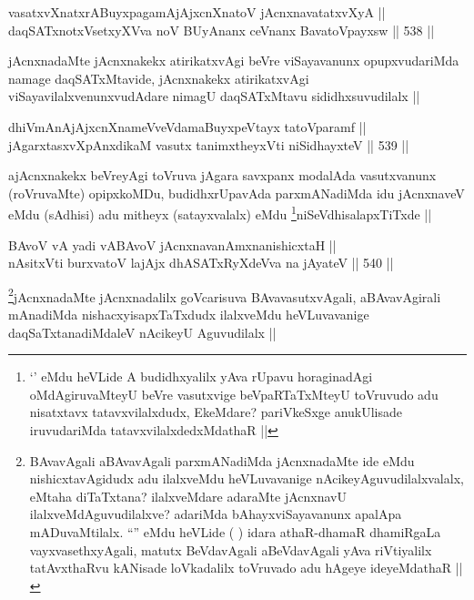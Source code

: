 
\begin{shl}
vasatxvXnatxrABuyxpagamAjAjxcnXnatoV jAcnxnavatatxvXyA || \\
daqSATxnotxV\s setxyXVva noV BUyAnanx ceVnanx BavatoV\s payxsw ||  538 ||  
\end{shl}

\begin{artha}
jAcnxnadaMte jAcnxnakekx atirikatxvAgi beVre viSayavanunx opupxvudariMda namage daqSATxMtavide, jAcnxnakekx atirikatxvAgi viSayavilalxvenunxvudAdare nimagU daqSATxMtavu sididhxsuvudilalx ||
\end{artha}


\begin{shl}
dhiVmAnAjAjxcnXnameVveVdamaBuyxpeVtayx tatoV\s paramf || \\
jAgarxtasxvXpAnxdikaM vasutx tanimxtheyxVti niSidhayxteV ||  539 ||  
\end{shl}

\begin{artha}
ajAcnxnakekx beVreyAgi toVruva jAgara savxpanx modalAda vasutxvanunx (roVruvaMte) opipxkoMDu, budidhxrUpavAda parxmANadiMda idu jAcnxnaveV eMdu (sAdhisi) adu mitheyx (satayxvalalx) eMdu \footnote{`\stext' eMdu heVLide A budidhxyalilx yAva rUpavu horaginadAgi oMdAgiruvaMteyU beVre vasutxvige beVpaRTaTxMteyU toVruvudo adu nisatxtavx tatavxvilalxdudx, EkeMdare? pariVkeSxge anukUlisade iruvudariMda tatavxvilalxdedxMdathaR ||}niSeVdhisalapxTiTxde ||
\end{artha}


\begin{shl}
BAvoV vA yadi vA\s BAvoV jAcnxnavanAmxnanishicxtaH || \\
nAsitxVti burxvatoV lajAjx dhASATxRyXdeVva na jAyateV ||  540 ||  
\end{shl}

\begin{artha}
\footnote{BAvavAgali aBAvavAgali parxmANadiMda jAcnxnadaMte ide eMdu nishicxtavAgidudx adu ilalxveMdu heVLuvavanige nAcikeyAguvudilalxvalalx, eMtaha diTaTxtana? ilalxveMdare adaraMte jAcnxnavU ilalxveMdAguvudilalxve? adariMda bAhayxviSayavanunx apalApa mADuvaMtilalx. ``\stext'' eMdu heVLide ( ) idara athaR-dhamaR dhamiRgaLa vayxvasethxyAgali, matutx BeVdavAgali aBeVdavAgali yAva riVtiyalilx tatAvxthaRvu kANisade loVkadalilx toVruvado adu hAgeye ideyeMdathaR ||}jAcnxnadaMte jAcnxnadalilx goVcarisuva BAvavasutxvAgali, aBAvavAgirali mAnadiMda nishacxyisapxTaTxdudx ilalxveMdu heVLuvavanige daqSaTxtanadiMdaleV nAcikeyU Aguvudilalx ||
\end{artha}

